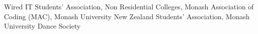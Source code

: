 \begin{cventries}
    \vspace*{-1.5cm}
    \cventry
    {} %
    {} %
    {} %
    {} %
    {
      \begin{cvitems} 
      { Wired IT Students' Association, Non Residential Colleges, Monash Association of Coding (MAC), Monash University New Zealand Students' Association, Monash University Dance Society}
      \end{cvitems}
    }



\end{cventries}
